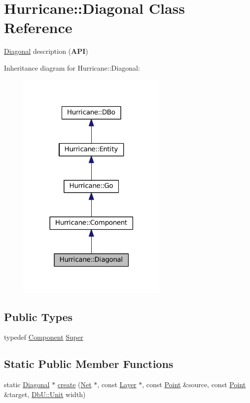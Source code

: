 \hypertarget{classHurricane_1_1Diagonal}{}\section{Hurricane\+:\+:Diagonal Class Reference}
\label{classHurricane_1_1Diagonal}


\mbox{\hyperlink{classHurricane_1_1Diagonal}{Diagonal}} description ({\bfseries A\+PI})  




Inheritance diagram for Hurricane\+:\+:Diagonal\+:\nopagebreak
\begin{figure}[H]
\begin{center}
\leavevmode
\includegraphics[width=206pt]{classHurricane_1_1Diagonal__inherit__graph}
\end{center}
\end{figure}
\subsection*{Public Types}
\begin{DoxyCompactItemize}
\item 
typedef \mbox{\hyperlink{classHurricane_1_1Component}{Component}} \mbox{\hyperlink{classHurricane_1_1Diagonal_aef5120a04b3b4db78b118e8c5daade90}{Super}}
\end{DoxyCompactItemize}
\subsection*{Static Public Member Functions}
\begin{DoxyCompactItemize}
\item 
static \mbox{\hyperlink{classHurricane_1_1Diagonal}{Diagonal}} $\ast$ \mbox{\hyperlink{classHurricane_1_1Diagonal_a83cd4332e78515e2c3745fd017e7441f}{create}} (\mbox{\hyperlink{classHurricane_1_1Net}{Net}} $\ast$, const \mbox{\hyperlink{classHurricane_1_1Layer}{Layer}} $\ast$, const \mbox{\hyperlink{classHurricane_1_1Point}{Point}} \&source, const \mbox{\hyperlink{classHurricane_1_1Point}{Point}} \&target, \mbox{\hyperlink{group__DbUGroup_ga4fbfa3e8c89347af76c9628ea06c4146}{Db\+U\+::\+Unit}} width)
\end{DoxyCompactItemize}
